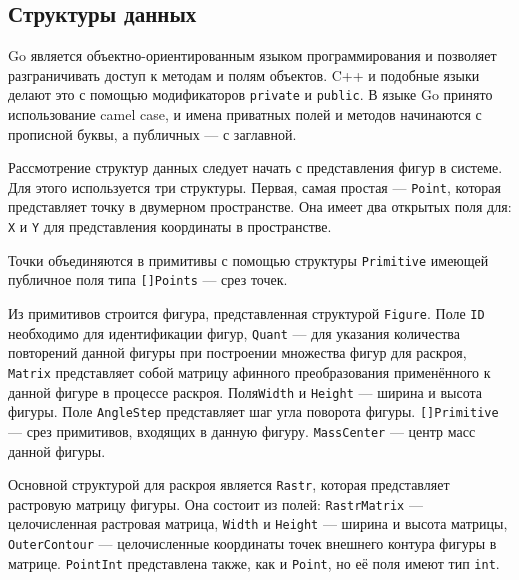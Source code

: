\documentclass[14pt]{extarticle}
\begin{document}
	\subsection{Структуры данных}
	Go является объектно-ориентированным языком программирования и позволяет разграничивать доступ к методам и полям объектов. C++ и подобные языки делают это с помощью модификаторов \lstinline!private! и \lstinline!public!. В языке Go принято использование camel case, и имена приватных полей и методов начинаются с прописной буквы, а публичных --- с заглавной.
	
	
	Рассмотрение структур данных следует начать с представления фигур в системе.
	Для этого используется три структуры. Первая, самая простая --- \lstinline!Point!, которая представляет точку в двумерном пространстве.	Она имеет два открытых поля для: \lstinline!X! и \lstinline!Y! для представления координаты в пространстве.
	
	
	Точки объединяются в примитивы с помощью структуры \lstinline|Primitive| имеющей публичное поля типа \lstinline|[]Points| --- срез точек.
	
	
	Из примитивов строится фигура, представленная структурой \lstinline|Figure|. Поле \lstinline|ID| необходимо для идентификации фигур, \lstinline|Quant| --- для указания количества повторений данной фигуры при построении множества фигур для раскроя, \lstinline|Matrix| представляет собой матрицу афинного преобразования применённого к данной фигуре в процессе раскроя. Поля\lstinline|Width| и \lstinline|Height| --- ширина и высота фигуры. Поле \lstinline|AngleStep| представляет шаг угла поворота фигуры. \lstinline|[]Primitive| --- срез примитивов, входящих в данную фигуру. \lstinline|MassCenter| --- центр масс данной фигуры.
	
	
	Основной структурой для раскроя является \lstinline|Rastr|, которая представляет растровую матрицу фигуры. Она состоит из полей: \lstinline|RastrMatrix| --- целочисленная растровая матрица, \lstinline|Width| и \lstinline|Height| --- ширина и высота матрицы, \lstinline|OuterContour| --- целочисленные координаты точек внешнего контура фигуры в матрице. \lstinline|PointInt| представлена также, как и \lstinline|Point|, но её поля имеют тип \lstinline|int|.
	
	
\end{document}
